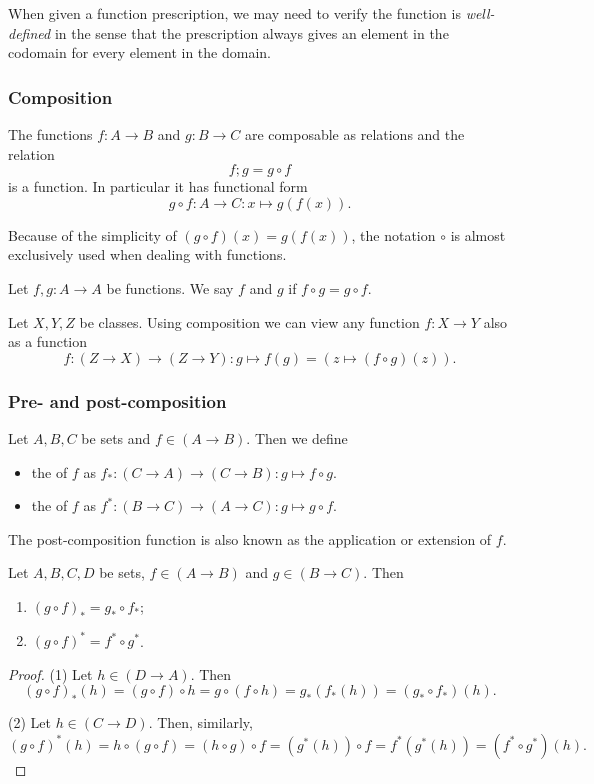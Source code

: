 When given a function prescription, we may need to verify the function is \emph{well-defined} in the sense that the prescription always gives an element in the codomain for every element in the domain.

\subsubsection{Composition}
\begin{lemma}
The functions $f:A\to B$ and $g:B\to C$ are composable as relations and the relation
\[ f;g = g\circ f \]
is a function. In particular it has functional form
\[ g\circ f: A\to C: x\mapsto g(f(x)). \]
\end{lemma}
Because of the simplicity of $(g\circ f)(x) = g(f(x))$, the notation $\circ$ is almost exclusively used when dealing with functions.

\begin{definition}
Let $f, g:A\to A$ be functions. We say $f$ and $g$  if $f\circ g = g\circ f$.
\end{definition}

\begin{note}
Let $X,Y,Z$ be classes. Using composition we can view any function $f: X\to Y$ also as a function
\[ f: (Z\to X)\to (Z\to Y): g\mapsto f(g) = (z\mapsto (f\circ g)(z)). \]
\end{note}

\subsubsection{Pre- and post-composition}
\begin{definition}
Let $A,B,C$ be sets and $f\in (A\to B)$. Then we define
\begin{itemize}
\item the  of $f$ as $f_*: (C\to A) \to (C\to B): g\mapsto f\circ g$.
\item the  of $f$ as $f^*: (B\to C) \to (A\to C): g\mapsto g\circ f$.
\end{itemize}
The post-composition function is also known as the  application or extension of $f$.
\end{definition}

\begin{lemma} \label{covarianceContravarianceComposition}
Let $A,B,C, D$ be sets, $f\in (A\to B)$ and $g\in(B\to C)$. Then
\begin{enumerate}
\item $(g\circ f)_* = g_*\circ f_*$;
\item $(g\circ f)^* = f^*\circ g^*$.
\end{enumerate}
\end{lemma}
\begin{proof}
(1) Let $h\in (D\to A)$. Then
\[(g\circ f)_*(h) = (g\circ f)\circ h = g\circ(f\circ h) = g_*(f_*(h)) = (g_*\circ f_*)(h). \]

(2) Let $h\in (C\to D)$. Then, similarly, 
\[ (g\circ f)^*(h) = h\circ (g\circ f) = (h\circ g)\circ f = (g^*(h))\circ f = f^*(g^*(h)) = (f^*\circ g^*)(h). \]
\end{proof}

